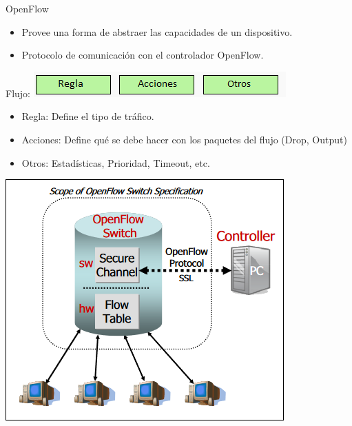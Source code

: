 \documentclass[xcolor=svgnames]{beamer}
\begin{document}
\begin{frame}{OpenFlow}
	\begin{itemize}
		\item Provee una forma de abstraer las capacidades de un dispositivo.
		\item Protocolo de comunicación con el controlador OpenFlow.
	\end{itemize}
	\pause
	\begin{minipage}[b]{0.4\textwidth}
		Flujo:
		\includegraphics[scale=0.55]{flujo_openflow}
		\begin{itemize}
			\item Regla: Define el tipo de tráfico.
			\item Acciones: Define qué se debe hacer con los paquetes del flujo (Drop, Output)
			\item Otros: Estadísticas, Prioridad, Timeout, etc.
		\end{itemize}
	\end{minipage}
	\hfill
	\pause
	\begin{minipage}[b]{0.5\textwidth}
		\includegraphics[scale=0.5]{switch_openflow}
	\end{minipage}
\end{frame}
\end{document}
